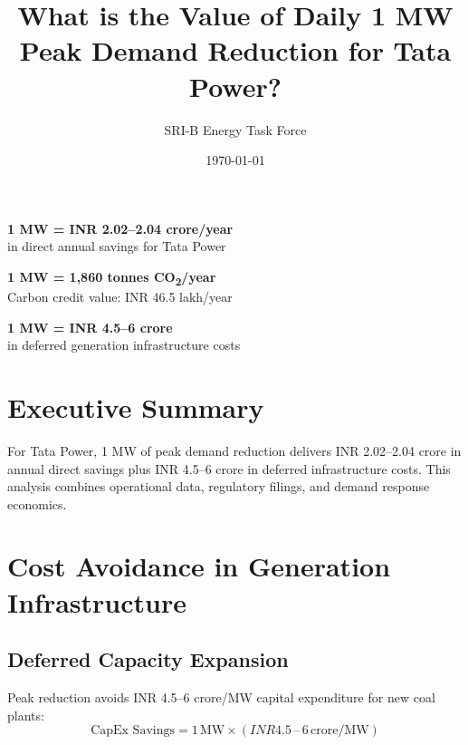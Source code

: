 \documentclass{article}
\title{What is the Value of Daily 1 MW Peak Demand Reduction for Tata Power?}
\author{SRI-B Energy Task Force}
\date{\today}
\begin{document}
\maketitle

\begin{tcolorbox}[colback=blue!10!white, colframe=blue!50!black, title=Financial Value, fonttitle=\bfseries]
\large\centering\textbf{1 MW = INR 2.02--2.04 crore/year}\\
\normalsize in direct annual savings for Tata Power
\end{tcolorbox}

\begin{tcolorbox}[colback=green!10!white, colframe=green!50!black, title=Environmental Impact, fonttitle=\bfseries]
\large\centering\textbf{1 MW = 1,860 tonnes CO\textsubscript{2}/year}\\
\normalsize Carbon credit value: INR 46.5 lakh/year
\end{tcolorbox}

\begin{tcolorbox}[colback=orange!10!white, colframe=orange!50!black, title=Infrastructure Value, fonttitle=\bfseries]
\large\centering\textbf{1 MW = INR 4.5--6 crore}\\
\normalsize in deferred generation infrastructure costs
\end{tcolorbox}

\section*{Executive Summary}
For Tata Power, 1 MW of peak demand reduction delivers INR 2.02--2.04 crore in annual direct savings plus INR 4.5--6 crore in deferred infrastructure costs. This analysis combines operational data, regulatory filings, and demand response economics.

\section{Cost Avoidance in Generation Infrastructure}
\subsection{Deferred Capacity Expansion}
Peak reduction avoids INR 4.5--6 crore/MW capital expenditure for new coal plants:
\begin{equation}
\text{CapEx Savings} = 1\,\text{MW} \times (INR 4.5\,\text{--}\,6\,\text{crore/MW})
\end{equation}
\end{document}
